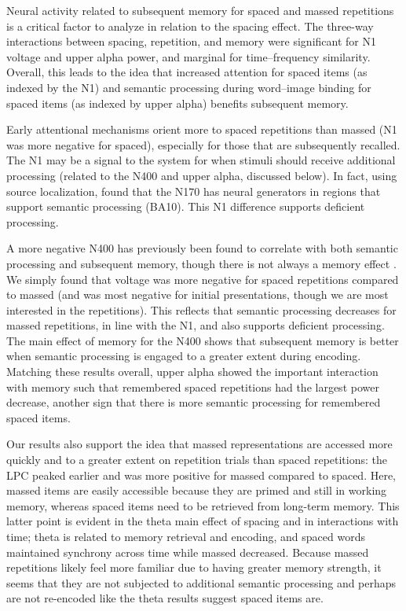 Neural activity related to subsequent memory for spaced and massed repetitions is a critical factor to analyze in relation to the spacing effect.  The three-way interactions between spacing, repetition, and memory were significant for N1 voltage and upper alpha power, and marginal for time--frequency similarity.  Overall, this leads to the idea that increased attention for spaced items (as indexed by the N1) and semantic processing during word--image binding for spaced items (as indexed by upper alpha) benefits subsequent memory.

Early attentional mechanisms orient more to spaced repetitions than massed (N1 was more negative for spaced), especially for those that are subsequently recalled.  The N1 may be a signal to the system for when stimuli should receive additional processing (related to the N400 and upper alpha, discussed below).  In fact, using source localization,  found that the N170 has neural generators in regions that support semantic processing (BA10).  This N1 difference supports deficient processing.


A more negative N400 has previously been found to correlate with both semantic processing and subsequent memory, though there is not always a memory effect \cite<reviewed in>{FrieJohn2000}.  We simply found that voltage was more negative for spaced repetitions compared to massed (and was most negative for initial presentations, though we are most interested in the repetitions).  This reflects that semantic processing decreases for massed repetitions, in line with the N1, and also supports deficient processing.  The main effect of memory for the N400 shows that subsequent memory is better when semantic processing is engaged to a greater extent during encoding.  Matching these results overall, upper alpha showed the important interaction with memory such that remembered spaced repetitions had the largest power decrease, another sign that there is more semantic processing for remembered spaced items.


Our results also support the idea that massed representations are accessed more quickly and to a greater extent on repetition trials than spaced repetitions: the LPC peaked earlier and was more positive for massed compared to spaced.  Here, massed items are easily accessible because they are primed and still in working memory, whereas spaced items need to be retrieved from long-term memory.  This latter point is evident in the theta main effect of spacing and in interactions with time; theta is related to memory retrieval and encoding, and spaced words maintained synchrony across time while massed decreased.  Because massed repetitions likely feel more familiar due to having greater memory strength, it seems that they are not subjected to additional semantic processing and perhaps are not re-encoded like the theta results suggest spaced items are.

